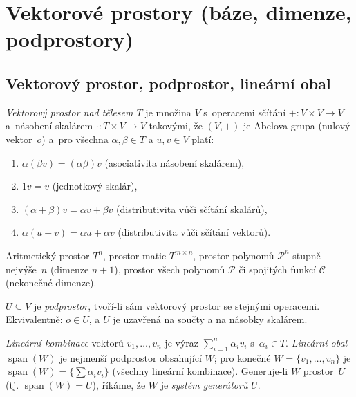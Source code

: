 \documentclass[11pt,a4paper]{article}
\newcommand{\spn}{\operatorname{span}}
\begin{document}
\section{Vektorové prostory (báze, dimenze, podprostory)}

\subsection{Vektorový prostor, podprostor, lineární obal}

\begin{definice}
\emph{Vektorový prostor nad tělesem $T$} je množina $V$ s~operacemi sčítání $+:V\times V\to V$ a~násobení skalárem $\cdot:T\times V\to V$ takovými, že $(V,+)$ je Abelova grupa (nulový vektor~$o$) a~pro všechna $\alpha,\beta\in T$ a $u,v\in V$ platí:
\begin{enumerate}[label=(\arabic*)]
  \item $\alpha(\beta v)=(\alpha\beta)v$ \quad(asociativita násobení skalárem),
  \item $1v=v$ \quad(jednotkový skalár),
  \item $(\alpha+\beta)v=\alpha v+\beta v$ \quad(distributivita vůči sčítání skalárů),
  \item $\alpha(u+v)=\alpha u+\alpha v$ \quad(distributivita vůči sčítání vektorů).
\end{enumerate}
\end{definice}

\begin{priklad}
Aritmetický prostor $T^n$, prostor matic $T^{m\times n}$, prostor polynomů $\mathcal P^n$ stupně nejvýše~$n$ (dimenze $n+1$), prostor všech polynomů $\mathcal P$ či spojitých funkcí $\mathcal C$ (nekonečné dimenze).
\end{priklad}


\begin{definice}[Podprostor]
$U\subseteq V$ je \emph{podprostor}, tvoří-li sám vektorový prostor se stejnými operacemi. Ekvivalentně: $o\in U$, a $U$ je uzavřená na součty a na násobky skalárem.
\end{definice}

\begin{definice}
\emph{Lineární kombinace} vektorů $v_1,\dots,v_n$ je výraz $\sum_{i=1}^n\alpha_iv_i$ s~$\alpha_i\in T$. \emph{Lineární obal} $\spn(W)$ je nejmenší podprostor obsahující $W$; pro konečné $W=\{v_1,\dots,v_n\}$ je $\spn(W)=\{\sum\alpha_iv_i\}$ (všechny lineární kombinace). Generuje-li $W$ prostor~$U$ (tj. $\spn(W)=U$), říkáme, že $W$ je \emph{systém generátorů} $U$.
\end{definice}
\end{document}
